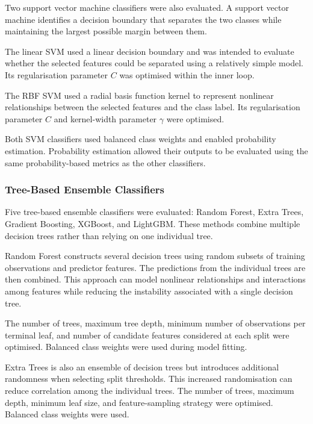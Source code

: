\documentclass[12pt,twocolumn]{article}
\begin{document}
Two support vector machine classifiers were also evaluated. A support
vector machine identifies a decision boundary that separates the two
classes while maintaining the largest possible margin between them.

The linear SVM used a linear decision boundary and was intended to
evaluate whether the selected features could be separated using a
relatively simple model. Its regularisation parameter \(C\) was
optimised within the inner loop.

The RBF SVM used a radial basis function kernel to represent nonlinear
relationships between the selected features and the class label. Its
regularisation parameter \(C\) and kernel-width parameter
\(\gamma\) were optimised.

Both SVM classifiers used balanced class weights and enabled
probability estimation. Probability estimation allowed their outputs
to be evaluated using the same probability-based metrics as the other
classifiers.





\subsubsection{Tree-Based Ensemble Classifiers}
\label{subsubsec:tree_classifiers}

Five tree-based ensemble classifiers were evaluated: Random Forest,
Extra Trees, Gradient Boosting, XGBoost, and LightGBM. These methods
combine multiple decision trees rather than relying on one individual
tree.

Random Forest constructs several decision trees using random subsets
of training observations and predictor features. The predictions from
the individual trees are then combined. This approach can model
nonlinear relationships and interactions among features while reducing
the instability associated with a single decision tree.

The number of trees, maximum tree depth, minimum number of observations
per terminal leaf, and number of candidate features considered at each
split were optimised. Balanced class weights were used during model
fitting.

Extra Trees is also an ensemble of decision trees but introduces
additional randomness when selecting split thresholds. This increased
randomisation can reduce correlation among the individual trees. The
number of trees, maximum depth, minimum leaf size, and feature-sampling
strategy were optimised. Balanced class weights were used.
\end{document}
